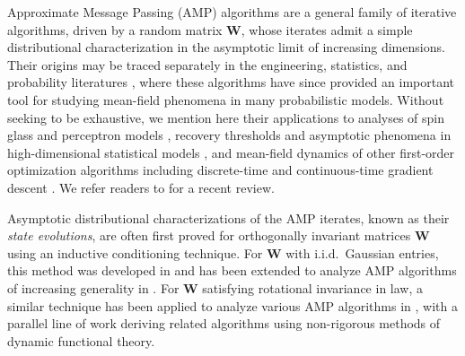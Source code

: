 \documentclass[10pt,reqno]{amsart}
\def\W{\mathbf{W}}
\begin{document}
Approximate Message Passing (AMP) algorithms are a general family of iterative
algorithms, driven by a random matrix $\W$,
whose iterates admit a simple distributional characterization in the asymptotic
limit of increasing dimensions. Their origins may be traced separately in the
engineering, statistics, and probability literatures
\cite{kabashima2003cdma,donoho2009message,bolthausen2014iterative}, where these
algorithms have since provided an important tool for studying mean-field
phenomena in many probabilistic models. Without seeking
to be exhaustive, we mention here their applications to analyses
of spin glass and perceptron models
\cite{bolthausen2018morita,ding2019capacity,fan2021replica,bolthausen2021gardner,fan2022tap},
recovery thresholds and asymptotic phenomena in high-dimensional statistical
models
\cite{donoho2009message,rangan2011generalized,rangan2012iterative,
donoho2013information,donoho2016high,dia2016mutual,bu2019algorithmic,sur2019likelihood,
montanari2021estimation,mondelli2021pca,zhong2021approximate,li2021minimum},
and mean-field dynamics of other first-order optimization
algorithms including discrete-time and continuous-time gradient descent
\cite{celentano2020estimation,celentano2021high}.
We refer readers to \cite{feng2022unifying} for a recent review. 

Asymptotic distributional characterizations of the AMP iterates, known as their
\emph{state evolutions}, are often first proved for orthogonally invariant
matrices $\W$ using an inductive
conditioning technique. For $\W$ with i.i.d.\ Gaussian entries, this
method was developed in \cite{bolthausen2014iterative,bayati2011dynamics}
and has been extended to analyze AMP algorithms of increasing generality in
\cite{rangan2011generalized,javanmard2013state,berthier2020state,montanari2021estimation,gerbelot2021graph}.
For $\W$ satisfying rotational invariance in law, a similar technique
has been applied to analyze various AMP algorithms in
\cite{rangan2019vector,schniter2016vector,ma2017orthogonal,takeuchi2017rigorous,
takeuchi2020convolutional,takeuchi2021bayes,liu2021memory,fan2022approximate},
with a parallel line of work
\cite{cakmak2014s,opper2016theory,ccakmak2019memory,ccakmak2020dynamical}
deriving related algorithms using non-rigorous methods of
dynamic functional theory.
\end{document}
